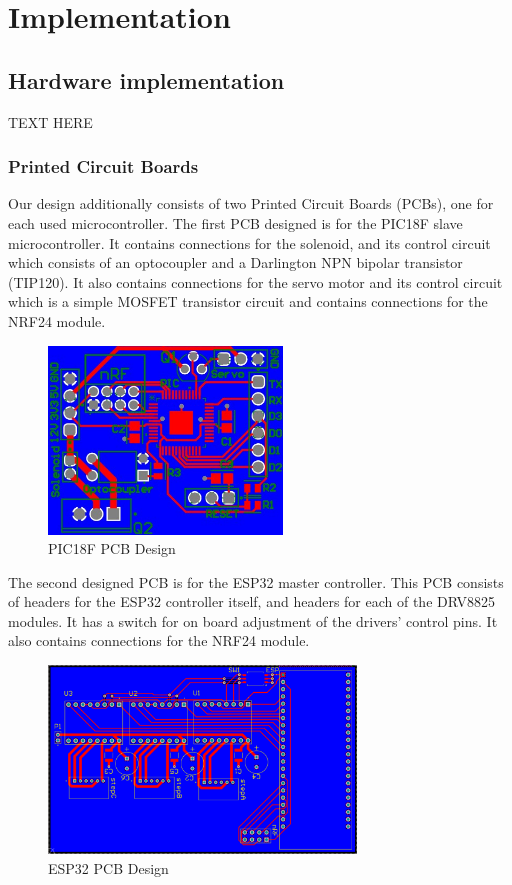 \chapter{Implementation}

\section{Hardware implementation}

TEXT HERE

\subsection{Printed Circuit Boards}

Our design additionally consists of two Printed Circuit Boards (PCBs), one for each used microcontroller. The first PCB designed is for the PIC18F slave microcontroller. It contains connections for the solenoid, and its control circuit which consists of an optocoupler and a Darlington NPN bipolar transistor (TIP120). It also contains connections for the servo motor and its control circuit which is a simple MOSFET transistor circuit and contains connections for the NRF24 module.

\begin{figure}[h]
	\centering\includegraphics[height=5cm]{./images/picpcb}
	\caption{PIC18F PCB Design}
\end{figure}

The second designed PCB is for the ESP32 master controller. This PCB consists of headers for the ESP32 controller itself, and headers for each of the DRV8825 modules. It has a switch for on board adjustment of the drivers' control pins. It also contains connections for the NRF24 module.

\begin{figure}[h]
	\centering\includegraphics[height=5cm]{./images/esppcb}
	\caption{ESP32 PCB Design}
\end{figure}


